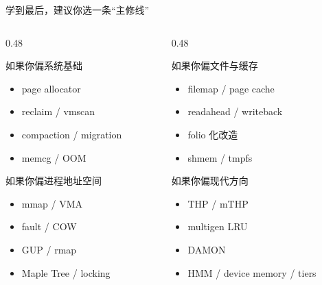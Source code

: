 \documentclass[UTF8,aspectratio=169]{ctexbeamer}
\begin{document}
\begin{frame}[t]{学到最后，建议你选一条“主修线”}
\small
\begin{columns}[T]
  \begin{column}{0.48\textwidth}
    \begin{block}{如果你偏系统基础}
    \begin{itemize}
      \item page allocator
      \item reclaim / vmscan
      \item compaction / migration
      \item memcg / OOM
    \end{itemize}
    \end{block}

    \begin{block}{如果你偏进程地址空间}
    \begin{itemize}
      \item mmap / VMA
      \item fault / COW
      \item GUP / rmap
      \item Maple Tree / locking
    \end{itemize}
    \end{block}
  \end{column}
  \begin{column}{0.48\textwidth}
    \begin{block}{如果你偏文件与缓存}
    \begin{itemize}
      \item filemap / page cache
      \item readahead / writeback
      \item folio 化改造
      \item shmem / tmpfs
    \end{itemize}
    \end{block}

    \begin{block}{如果你偏现代方向}
    \begin{itemize}
      \item THP / mTHP
      \item multigen LRU
      \item DAMON
      \item HMM / device memory / tiers
    \end{itemize}
    \end{block}
  \end{column}
\end{columns}
\end{frame}
\end{document}

